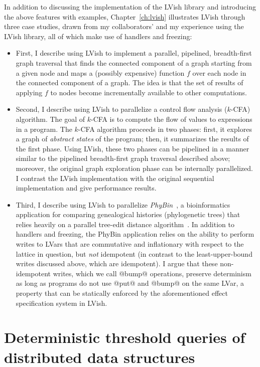 In addition to discussing the implementation of the LVish library and
introducing the above features with examples, Chapter~\ref{ch:lvish}
illustrates LVish through three case studies, drawn from my
collaborators' and my experience using the LVish library, all of which
make use of handlers and freezing:
\begin{itemize}
\item First, I describe using LVish to implement a parallel,
  pipelined, breadth-first graph traversal that finds the connected
  component of a graph starting from a given node and maps a (possibly
  expensive) function $f$ over each node in the connected component of
  a graph.  The idea is that the set of results of applying $f$ to
  nodes become incrementally available to other computations.
\item Second, I describe using LVish to parallelize a control flow
  analysis ($k$-CFA) algorithm.  The goal of $k$-CFA is to compute the
  flow of values to expressions in a program.  The $k$-CFA algorithm
  proceeds in two phases: first, it explores a graph of \emph{abstract
    states} of the program; then, it summarizes the results of the
  first phase.  Using LVish, these two phases can be pipelined in a
  manner similar to the pipelined breadth-first graph traversal
  described above; moreover, the original graph exploration phase can
  be internally parallelized.  I contrast the LVish implementation
  with the original sequential implementation and give performance
  results.
\item Third, I describe using LVish to parallelize
  \emph{PhyBin}~\cite{PhyBin}, a bioinformatics application for
  comparing genealogical histories (phylogenetic trees) that relies
  heavily on a parallel tree-edit distance algorithm~\cite{hashrf}.
  In addition to handlers and freezing, the PhyBin application relies
  on the ability to perform writes to LVars that are commutative and
  inflationary with respect to the lattice in question, but \emph{not}
  idempotent (in contrast to the least-upper-bound writes discussed
  above, which are idempotent).  I argue that these non-idempotent
  writes, which we call @bump@ operations, preserve determinism as
  long as programs do not use @put@ and @bump@ on the same LVar, a
  property that can be statically enforced by the aforementioned
  effect specification system in LVish.
\end{itemize}

\section{Deterministic threshold queries of distributed data structures}\label{s:intro-cvrdts}

